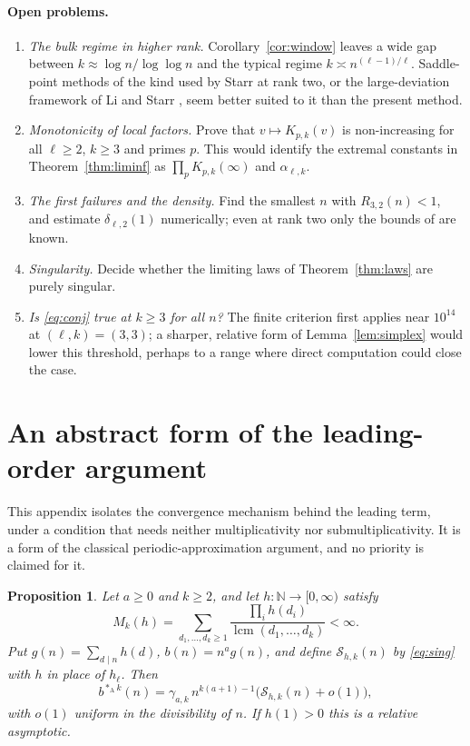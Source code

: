 \documentclass[11pt,a4paper]{article}
\newtheorem{proposition}[theorem]{Proposition}
\theoremstyle{remark}
\numberwithin{equation}{section}
\newcommand{\Sing}{\mathcal S}
\newcommand{\lcm}{\operatorname{lcm}}
\newcommand{\Ac}{*_{\mathrm A}}
\begin{document}
\paragraph{Open problems.}
\begin{enumerate}
\item \emph{The bulk regime in higher rank.} Corollary~\ref{cor:window} leaves a wide gap between $k\approx\log n/\log\log n$ and the typical regime $k\asymp n^{(\ell-1)/\ell}$. Saddle-point methods of the kind used by Starr \cite{Starr2026b} at rank two, or the large-deviation framework of Li and Starr \cite{LiStarr}, seem better suited to it than the present method.
\item \emph{Monotonicity of local factors.} Prove that $v\mapsto K_{p,k}(v)$ is non-increasing for all $\ell\ge2$, $k\ge3$ and primes $p$. This would identify the extremal constants in Theorem~\ref{thm:liminf} as $\prod_pK_{p,k}(\infty)$ and $\alpha_{\ell,k}$.
\item \emph{The first failures and the density.} Find the smallest $n$ with $R_{3,2}(n)<1$, and estimate $\delta_{\ell,2}(1)$ numerically; even at rank two only the bounds of \cite{CHS2026} are known.
\item \emph{Singularity.} Decide whether the limiting laws of Theorem~\ref{thm:laws} are purely singular.
\item \emph{Is \eqref{eq:conj} true at $k\ge3$ for all $n$?} The finite criterion first applies near $10^{14}$ at $(\ell,k)=(3,3)$; a sharper, relative form of Lemma~\ref{lem:simplex} would lower this threshold, perhaps to a range where direct computation could close the case.
\end{enumerate}

\appendix
\section{An abstract form of the leading-order argument}\label{app:abstract}

This appendix isolates the convergence mechanism behind the leading term, under a condition that needs neither multiplicativity nor submultiplicativity. It is a form of the classical periodic-approximation argument, and no priority is claimed for it.

\begin{proposition}\label{prop:abstract}
Let $a\ge0$ and $k\ge2$, and let $h:\mathbb N\to[0,\infty)$ satisfy
\[
M_k(h)=\sum_{d_1,\ldots,d_k\ge1}\frac{\prod_ih(d_i)}{\lcm(d_1,\ldots,d_k)}<\infty .
\]
Put $g(n)=\sum_{d\mid n}h(d)$, $b(n)=n^ag(n)$, and define $\Sing_{h,k}(n)$ by \eqref{eq:sing} with $h$ in place of $h_\ell$. Then
\[
b^{\Ac k}(n)=\gamma_{a,k}\,n^{k(a+1)-1}\bigl(\Sing_{h,k}(n)+o(1)\bigr),
\]
with $o(1)$ uniform in the divisibility of $n$. If $h(1)>0$ this is a relative asymptotic.
\end{proposition}
\end{document}

